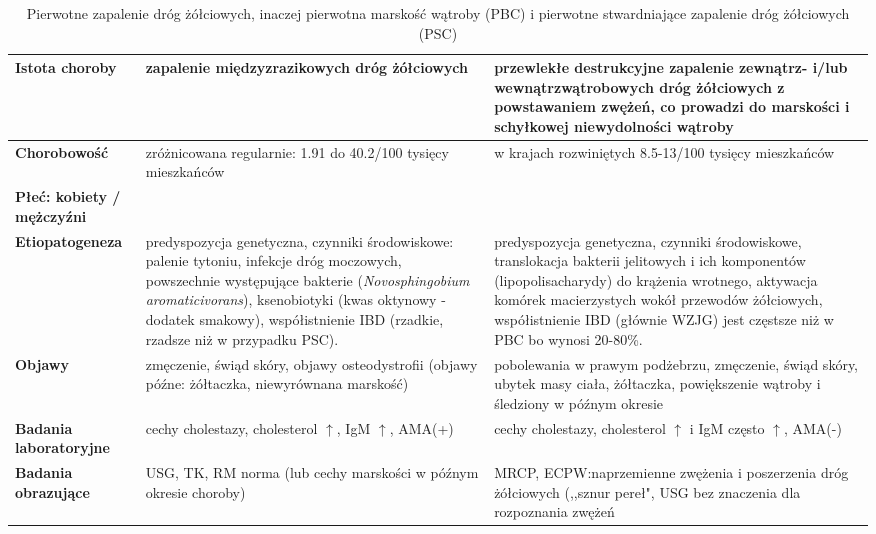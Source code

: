 \begin{sidewaystable}
    \centering
    \caption{Pierwotne zapalenie dróg żółciowych, inaczej pierwotna marskość wątroby (PBC) i pierwotne stwardniające zapalenie dróg żółciowych (PSC)}
    \label{tab:PBC_vs_PSC}
    \begin{tabular}{|p{5cm}|p{9cm}|p{9cm}|}
    \hline 
    \textbf{Istota choroby} & zapalenie międzyzrazikowych dróg żółciowych & przewlekłe destrukcyjne zapalenie zewnątrz- i/lub wewnątrzwątrobowych dróg żółciowych z powstawaniem zwężeń, co prowadzi do marskości i schyłkowej niewydolności wątroby \\
    \hline   
    \textbf{Chorobowość} & zróżnicowana regularnie: 1.91 do 40.2/100 tysięcy mieszkańców  & w krajach rozwiniętych 8.5-13/100 tysięcy mieszkańców \\
    \hline
    \textbf{Płeć: 
        kobiety / mężczyźni} &  & \\
    \hline
    \textbf{Etiopatogeneza} & predyspozycja genetyczna, czynniki środowiskowe: palenie tytoniu, infekcje dróg moczowych, powszechnie występujące bakterie (\textit{Novosphingobium aromaticivorans}), ksenobiotyki (kwas oktynowy - dodatek smakowy), współistnienie IBD (rzadkie, rzadsze niż w przypadku PSC).    & predyspozycja genetyczna, czynniki środowiskowe, translokacja bakterii jelitowych i ich komponentów (lipopolisacharydy) do krążenia wrotnego, aktywacja komórek macierzystych wokół przewodów żółciowych, współistnienie IBD (głównie WZJG) jest częstsze niż w PBC bo wynosi 20-80\%.\\
    \hline
    \textbf{Objawy} & zmęczenie, świąd skóry, objawy osteodystrofii (objawy późne: żółtaczka, niewyrównana marskość) & pobolewania w prawym podżebrzu, zmęczenie, świąd skóry, ubytek masy ciała, żółtaczka, powiększenie wątroby i śledziony w późnym okresie \\
    \hline
    \textbf{Badania laboratoryjne} & cechy cholestazy, cholesterol $\uparrow$, IgM $\uparrow$, AMA(+) & cechy cholestazy, cholesterol $\uparrow$ i IgM często $\uparrow$, AMA(-)\\
    \hline
    \textbf{Badania obrazujące} & USG, TK, RM norma (lub cechy marskości w późnym okresie choroby) & MRCP, ECPW:naprzemienne zwężenia i poszerzenia dróg żółciowych (,,sznur pereł", USG bez znaczenia dla rozpoznania zwężeń \\
    \hline
    \end{tabular}
\end{sidewaystable}